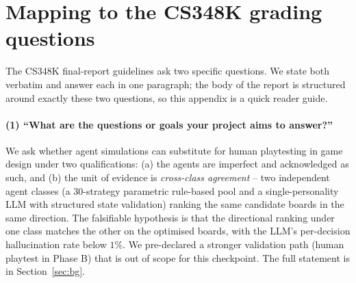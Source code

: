\documentclass[10pt]{article}
\begin{document}
\section{Mapping to the CS348K grading questions}\label{app:grading}

The CS348K final-report guidelines ask two specific questions. We
state both verbatim and answer each in one paragraph; the body of
the report is structured around exactly these two questions, so
this appendix is a quick reader guide.

\paragraph{(1) ``What are the questions or goals your project aims
to answer?''}
We ask whether agent simulations can substitute for human
playtesting in game design under two qualifications: (a) the agents
are imperfect and acknowledged as such, and (b) the unit of
evidence is \emph{cross-class agreement} -- two independent agent
classes (a 30-strategy parametric rule-based pool and a
single-personality LLM with structured state validation) ranking
the same candidate boards in the same direction. The falsifiable
hypothesis is that the directional ranking under one class matches
the other on the optimised boards, with the LLM's per-decision
hallucination rate below $1\%$. We pre-declared a stronger
validation path (human playtest in Phase B) that is out of scope
for this checkpoint. The full statement is in
Section~\ref{sec:bg}.
\end{document}
